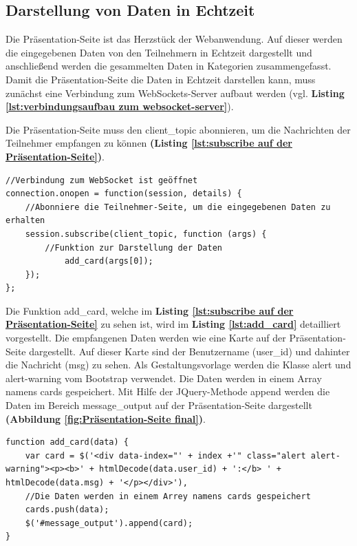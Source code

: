 \subsection{Darstellung von Daten in Echtzeit}
\label{subsce:Darstellung von Daten in Echtzeit}
Die Präsentation-Seite ist das Herzstück der Webanwendung. Auf dieser werden die eingegebenen Daten von den Teilnehmern in Echtzeit dargestellt und anschließend werden die gesammelten Daten in Kategorien zusammengefasst. Damit die Präsentation-Seite die Daten in Echtzeit darstellen kann, muss zunächst eine Verbindung zum WebSockets-Server aufbaut werden (vgl. \textbf{Listing \ref{lst:verbindungsaufbau zum websocket-server}}).\bigskip

Die Präsentation-Seite muss den \glqq client\_topic\grqq{} abonnieren, um die Nachrichten der Teilnehmer empfangen zu können \textbf{(Listing \ref{lst:subscribe auf der Präsentation-Seite})}.\bigskip

\begin{lstlisting}[caption={Subscribe-Muster auf der Präsentation-Seite - JavaScript}, label=lst:subscribe auf der Präsentation-Seite, captionpos=b]
//Verbindung zum WebSocket ist geöffnet
connection.onopen = function(session, details) {
	//Abonniere die Teilnehmer-Seite, um die eingegebenen Daten zu erhalten
	session.subscribe(client_topic, function (args) {
		//Funktion zur Darstellung der Daten
    		add_card(args[0]);
	});
};
\end{lstlisting}

Die Funktion \glqq add\_card\grqq{}, welche im \textbf{Listing \ref{lst:subscribe auf der Präsentation-Seite}} zu sehen ist, wird im \textbf{Listing \ref{lst:add_card}} detailliert vorgestellt. Die empfangenen Daten werden wie eine Karte auf der Präsentation-Seite dargestellt. Auf dieser Karte sind der Benutzername (user\_id) und dahinter die Nachricht (msg) zu sehen. Als Gestaltungsvorlage werden die Klasse \glqq alert\grqq{} und \glqq alert-warning\grqq{} vom Bootstrap verwendet. Die Daten werden in einem Array namens \glqq cards\grqq{} gespeichert. Mit Hilfe der JQuery-Methode \glqq append\grqq{} werden die Daten im Bereich \glqq message\_output\grqq{} auf der Präsentation-Seite dargestellt \textbf{(Abbildung \ref{fig:Präsentation-Seite final})}.\bigskip

\begin{lstlisting}[caption={Funktion zur Visualisieren der Daten auf der Präsentation-Seite - JavaScript}, label=lst:add_card, captionpos=b]
function add_card(data) {
	var card = $('<div data-index="' + index +'" class="alert alert-warning"><p><b>' + htmlDecode(data.user_id) + ':</b> ' + htmlDecode(data.msg) + '</p></div>'),
	//Die Daten werden in einem Arrey namens cards gespeichert
	cards.push(data);
    $('#message_output').append(card);
}
\end{lstlisting}

